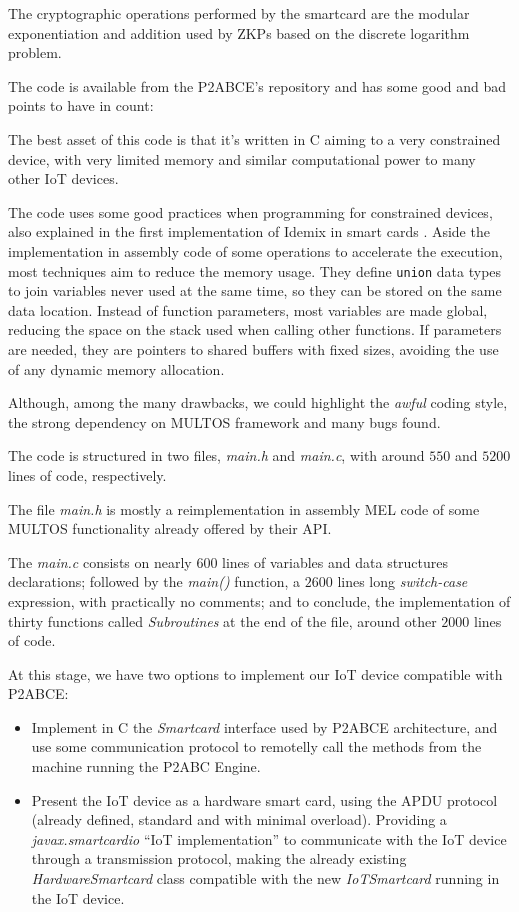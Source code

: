 The cryptographic operations performed by the smartcard are the modular exponentiation and addition used by ZKPs based on the discrete logarithm problem.

\hfil

The code is available from the P2ABCE's repository and has some good and bad points to have in count:

The best asset of this code is that it's written in C aiming to a very constrained device, with very limited memory and similar computational power to many other IoT devices.

The code uses some good practices when programming for constrained devices, also explained in the first implementation of Idemix in smart cards \citep{vullers2013efficient}. Aside the implementation in assembly code of some operations to accelerate the execution, most techniques aim to reduce the memory usage. They define \texttt{union} data types to join variables never used at the same time, so they can be stored on the same data location. Instead of function parameters, most variables are made global, reducing the space on the stack used when calling other functions. If parameters are needed, they are pointers to shared buffers with fixed sizes, avoiding the use of any dynamic memory allocation.


Although, among the many drawbacks, we could highlight the \textit{awful} coding style, the strong dependency on MULTOS framework and many bugs found. 

The code is structured in two files, \textit{main.h} and \textit{main.c}, with around $550$ and $5200$ lines of code, respectively.

The file \textit{main.h} is mostly a reimplementation in assembly MEL code of some MULTOS functionality already offered by their API.

The \textit{main.c} consists on nearly $600$ lines of variables and data structures declarations; followed by the \textit{main()} function, a $2600$ lines long \textit{switch-case} expression, with practically no comments; and to conclude, the implementation of thirty functions called \textit{Subroutines} at the end of the file, around other $2000$ lines of code.

\hfil

At this stage, we have two options to implement our IoT device compatible with P2ABCE:

\begin{itemize}
	\item Implement in C the \textit{Smartcard} interface used by P2ABCE architecture, and use some communication protocol to remotelly call the methods from the machine running the P2ABC Engine.
	\item Present the IoT device as a hardware smart card, using the APDU protocol (already defined, standard and with minimal overload). Providing a \textit{javax.smartcardio} ``IoT implementation'' to communicate with the IoT device through a transmission protocol, making the already existing \textit{HardwareSmartcard} class compatible with the new \textit{IoTSmartcard} running in the IoT device.
\end{itemize}

